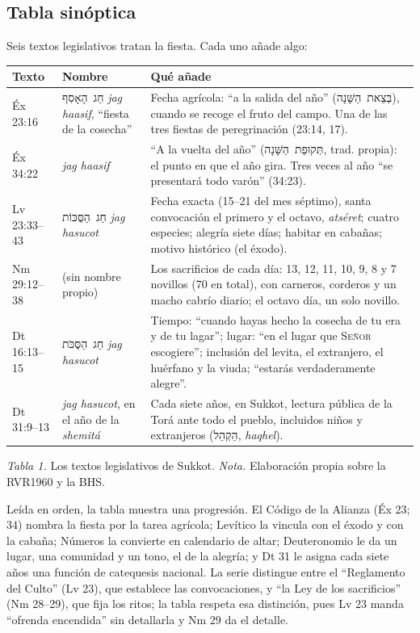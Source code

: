 \documentclass[11pt,letterpaper]{article}
\newcommand{\heb}[1]{\mbox{\foreignlanguage{hebrew}{#1}}}
\newcommand{\SENOR}{\textsc{Señor}}
\begin{document}
\subsection{Tabla sinóptica}
Seis textos legislativos tratan la fiesta. Cada uno añade algo:

\begin{center}\small\renewcommand{\arraystretch}{1.2}
\begin{tabular}{@{}L{2.4cm}L{3.4cm}L{8.6cm}@{}}
\toprule
\textbf{Texto} & \textbf{Nombre} & \textbf{Qué añade} \\ \midrule
Éx 23:16 & \heb{חַג הָאָסִף} \emph{jag haasif}, ``fiesta de la cosecha'' & Fecha agrícola: ``a la salida del año'' (\heb{בְּצֵאת הַשָּׁנָה}), cuando se recoge el fruto del campo. Una de las tres fiestas de peregrinación (23:14, 17). \\
Éx 34:22 & \emph{jag haasif} & ``A la vuelta del año'' (\heb{תְּקוּפַת הַשָּׁנָה}, trad. propia): el punto en que el año gira. Tres veces al año ``se presentará todo varón'' (34:23). \\
Lv 23:33--43 & \heb{חַג הַסֻּכּוֹת} \emph{jag hasucot} & Fecha exacta (15--21 del mes séptimo), santa convocación el primero y el octavo, \emph{atséret}; cuatro especies; alegría siete días; habitar en cabañas; motivo histórico (el éxodo). \\
Nm 29:12--38 & (sin nombre propio) & Los sacrificios de cada día: 13, 12, 11, 10, 9, 8 y 7 novillos (70 en total), con carneros, corderos y un macho cabrío diario; el octavo día, un solo novillo. \\
Dt 16:13--15 & \heb{חַג הַסֻּכֹּת} \emph{jag hasucot} & Tiempo: ``cuando hayas hecho la cosecha de tu era y de tu lagar''; lugar: ``en el lugar que \SENOR{} escogiere''; inclusión del levita, el extranjero, el huérfano y la viuda; ``estarás verdaderamente alegre''. \\
Dt 31:9--13 & \emph{jag hasucot}, en el año de la \emph{shemitá} & Cada siete años, en Sukkot, lectura pública de la Torá ante todo el pueblo, incluidos niños y extranjeros (\heb{הַקְהֵל}, \emph{haqhel}). \\
\bottomrule
\end{tabular}\par
{\footnotesize\color{sepia}\textit{Tabla 1.} Los textos legislativos de Sukkot. \textit{Nota.} Elaboración propia sobre la RVR1960 y la BHS.}
\end{center}

Leída en orden, la tabla muestra una progresión. El Código de la Alianza (Éx 23; 34) nombra la fiesta por la tarea agrícola; Levítico la vincula con el éxodo y con la cabaña; Números la convierte en calendario de altar; Deuteronomio le da un lugar, una comunidad y un tono, el de la alegría; y Dt 31 le asigna cada siete años una función de catequesis nacional. La serie distingue entre el ``Reglamento del Culto'' (Lv 23), que establece las convocaciones, y ``la Ley de los sacrificios'' (Nm 28--29), que fija los ritos; la tabla respeta esa distinción, pues Lv 23 manda ``ofrenda encendida'' sin detallarla y Nm 29 da el detalle.
\end{document}
